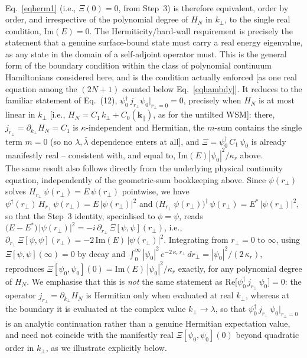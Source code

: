 \documentclass[aps,prb,onecolumn, footinbib, 10pt]{revtex4-2}
\begin{document}
{{\begin{itemize}
\begin{align}
\end{align}
Eq.~\eqref{eqherm1} (i.e., $\Xi(0)=0$, from Step~3) is therefore equivalent, order by order, and irrespective of the polynomial degree of $H_N$ in $k_\perp$, to the single real condition, $\mathrm{Im}(E)=0$. The Hermiticity/hard-wall requirement is precisely the statement that a genuine surface-bound state must carry a real energy eigenvalue, as any state in the domain of a self-adjoint operator must. This is the general form of the boundary condition within the class of polynomial continuum Hamiltonians considered here, and is the condition actually enforced [as one real equation among the $(2N+1)$ counted below Eq.~\eqref{eqhambdy}]. It reduces to the familiar statement of Eq.~(12), $\psi_0^\dagger \, j_{r_\perp}  \psi_0 \big \vert_{r_\perp=0}=0$, precisely when $H_N$ is at most linear in $k_\perp$ [i.e., $H_N=C_1 \,k_\perp+C_0(\boldsymbol k_\parallel)$, as for the untilted WSM]: there, $j_{r_\perp}=\partial_{k_\perp}H_N=C_1$ is $\kappa$-independent and Hermitian, the $m$-sum contains the single term $m=0$ (so no $\lambda,\bar\lambda$ dependence enters at all], and $\Xi=\psi_0^\dagger \, C_1  \,  \psi_0$ is already manifestly real -- consistent with, and equal to, $\mathrm{Im}(E)|\psi_0|^2/\kappa_r$ above.
\\The same result also follows directly from the underlying physical continuity equation, independently of the geometric-sum bookkeeping above. Since $\psi(r_\perp)$ solves $H_{r_\perp} \, \psi(r_\perp) = E \, \psi(r_\perp)$ pointwise, we have $\psi^\dagger(r_\perp) \, H_{r_\perp} \, \psi(r_\perp) = E \, |\psi(r_\perp)|^2$ and $\big(H_{r_\perp} \, \psi(r_\perp)\big)^\dagger \, \psi(r_\perp) = E^* \, |\psi(r_\perp)|^2$, so that the Step~3 identity, specialised to $\phi=\psi$, reads $\big(E-E^*\big) \, |\psi(r_\perp)|^2 = -i \, \partial_{r_\perp} \, \Xi[\psi,\psi](r_\perp)$, i.e., $\partial_{r_\perp} \, \Xi[\psi,\psi](r_\perp) = -2 \, \mathrm{Im}(E) \, |\psi(r_\perp)|^2$. Integrating from $r_\perp=0$ to $\infty$, using $\Xi[\psi,\psi](\infty)=0$ by decay and $\int_0^\infty |\psi_0|^2 \, e^{-2 \, \kappa_r \, r_\perp} \, dr_\perp = |\psi_0|^2/(2 \, \kappa_r)$, reproduces $\Xi[\psi_0,\psi_0](0) = \mathrm{Im}(E) \, |\psi_0|^2/\kappa_r$ exactly, for any polynomial degree of $H_N$. We emphasise that this is \textit{not} the same statement as $\mathrm{Re}\big[\psi_0^\dagger \, j_{r_\perp} \, \psi_0\big]=0$: the operator $j_{r_\perp} = \partial_{k_\perp} H_N$ is Hermitian only when evaluated at real $k_\perp$, whereas at the boundary it is evaluated at the complex value $k_\perp\to\lambda$, so that $\psi_0^\dagger \, j_{r_\perp} \, \psi_0\big\vert_{r_\perp=0}$ is an analytic continuation rather than a genuine Hermitian expectation value, and need not coincide with the manifestly real $\Xi[\psi_0,\psi_0](0)$ beyond quadratic order in $k_\perp$, as we illustrate explicitly below.


\end{itemize}}}
\end{document}
